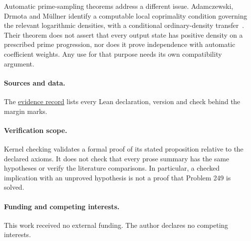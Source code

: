 \documentclass[11pt]{article}
\theoremstyle{plain}
\theoremstyle{definition}
\theoremstyle{remark}
\begin{document}
Automatic prime-sampling theorems address a different issue.
Adamczewski, Drmota and M\"ullner identify a computable local coprimality
condition governing the relevant logarithmic densities, with a conditional
ordinary-density transfer~\cite[Thm.~1.4 and Rem.~1.5]{adamczewski-drmota-mullner}.
Their theorem does not assert that every output state has positive density
on a prescribed prime progression, nor does it prove independence with
automatic coefficient weights. Any use for that purpose needs its own
compatibility argument.

\paragraph{Sources and data.} The \href{\evidencerecordurl}{evidence record}
lists every Lean declaration, version and check behind the margin marks.

\paragraph{Verification scope.} Kernel checking validates a formal proof of
its stated proposition relative to the declared axioms. It does not check
that every prose summary has the same hypotheses or verify the literature
comparisons. In particular, a checked implication with an unproved
hypothesis is not a proof that Problem 249 is solved.

\paragraph{Funding and competing interests.} This work received no external
funding. The author declares no competing interests.
\end{document}
